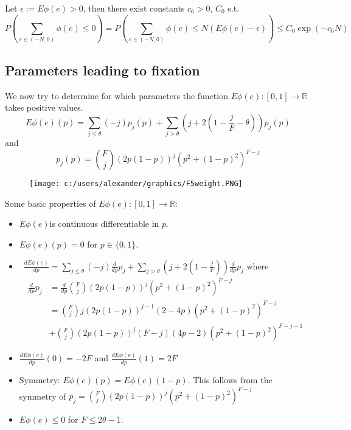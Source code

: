 \documentclass[
paper=128mm:96mm, %
fontsize=11pt, %
pagesize, %
parskip=half-, %
]{scrartcl} %
\theoremstyle{mythmstyle} %
\begin{document}
Let $\epsilon := E\phi(e)>0$, then there exist constants $c_6>0$, $C_0$ s.t.
\begin{equation}
P(\sum_{e \in (-N,0)}\phi(e) \leq 0 ) = P(\sum_{e \in (-N,0)}\phi(e) \leq N(E\phi(e)- \epsilon)) \leq C_0\exp(-c_6N)
\end{equation}

\clearpage

\subsection{Parameters leading to fixation}
We now try to determine for which parameters the function $E\phi(e): [0,1] \rightarrow \mathbb{R}$ takes positive values.
$$E\phi(e)(p) = \sum_{j \leq \theta}(-j)p_j(p) + \sum_{j>\theta}(j+2(1-\frac{j}{F}- \theta ))p_j(p)$$ 
and 
$$p_j(p) = \binom{F}{j}(2p(1-p))^j(p^2+(1-p)^2)^{F-j}$$ 

\clearpage 
\begin{figure}[h]
\centering\texttt{[image: c:/users/alexander/graphics/F5weight.PNG]}
\end{figure}

\clearpage

Some basic properties of $E\phi(e): [0,1] \rightarrow \mathbb{R}$:
\begin{itemize}
\item $E\phi(e)$is continuous differentiable in $p$.
\item $E\phi(e)(p)=0$ for $p\in\{0,1\}$.
\item\ $\frac{dE\phi(e)}{dp} = \sum_{j \leq \theta}(-j)\frac{d}{dp} p_j + \sum_{j>\theta}(j+2(1-\frac{j}{F}))\frac{d}{dp} p_j$ where 
\begin{equation}
\begin{split}
\frac{d}{dp} p_j &= \frac{d}{dp}\binom{F}{j}(2p(1-p))^j(p^2 + (1-p)^2)^{F-j} \\
&= \binom{F}{j}j(2p(1-p))^{j-1}(2-4p)(p^2 + (1-p)^2)^{F - j}\\
& + \binom{F}{j}(2p(1-p))^j(F - j)(4p - 2)(p^2 + (1-p)^2)^{F - j-1} 
\end{split}
\end{equation}
\item $\frac{dE\phi(e)}{dp}(0)=-2F$ and $\frac{dE\phi(e)}{dp}(1)=2F$
\item Symmetry: $E\phi(e)(p)=E\phi(e)(1-p)$. This follows from the symmetry of $p_j = \binom{F}{j}(2p(1-p))^j(p^2+(1-p)^2)^{F-j}$
\item $E\phi(e) \leq 0$ for $F \leq 2\theta-1$. 
\end{itemize}
\clearpage
\end{document}
